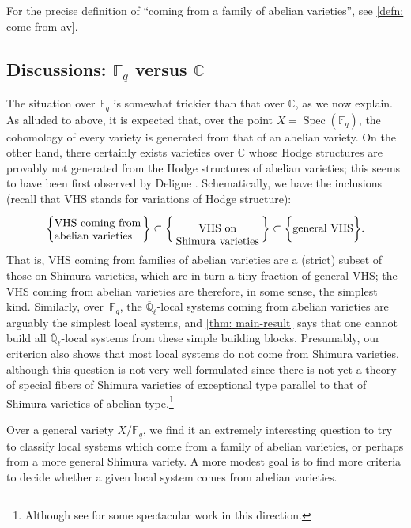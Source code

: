 \documentclass[11pt]{article}
\numberwithin{equation}{subsection}
\theoremstyle{definition}
\DeclareMathOperator\Spec{Spec}
\newcommand{\Qlbar}{\overline{\mathbb{Q}}_{\ell}}
\let\mb\mathbb
\begin{document}
For the precise definition of \enquote{coming from a family of abelian varieties}, see \cref{defn: come-from-av}.

\subsection{Discussions: \texorpdfstring{$\mb{F}_q$}{Fq} versus \texorpdfstring{$\mb{C}$}{C}}
The situation over $\mb{F}_q$ is somewhat trickier than that over $\mb{C}$, as we now explain. As alluded to above, it is expected that, over the point $X=\Spec(\mb{F}_q)$, the cohomology of every variety is generated from that of an abelian variety. On the other hand, there certainly exists varieties over $\mb{C}$ whose Hodge structures are provably not generated from the Hodge structures of abelian varieties; this seems to have been first observed by Deligne \cite[\S 7.6]{Deligne-La-conjecture-de-Weil-pour-les-surfaces-K3}.
Schematically, we have the inclusions (recall that VHS stands for variations of Hodge structure):
\[
\bigg\{
\parbox{8em}{VHS coming from\\abelian varieties}
\bigg\} \subset
\bigg\{\parbox{8em}{\center VHS on \\Shimura varieties}
\bigg\} \subset
\bigg\{
\parbox{5.5em}{general VHS}
\bigg\}.
\]
That is, VHS coming from families of abelian varieties are a (strict) subset of those on Shimura varieties, which are in turn a tiny fraction of general VHS; the VHS coming from abelian varieties are therefore, in some sense, the simplest kind. Similarly, over~$\mb{F}_q$, the $\Qlbar$-local systems coming from abelian varieties are arguably the simplest local systems, and \cref{thm: main-result} says that one cannot build all $\Qlbar$-local systems from these simple building blocks. Presumably, our criterion also shows that most local systems do not come from Shimura varieties, although this question is not very well formulated since there is not yet a theory of special fibers of Shimura varieties of exceptional type parallel to that of Shimura varieties of abelian type.\footnote{Although see \cite{Bakker-Shankar-Tsimerman-Integral-Canonical-Models-of-Exceptional-Shimura-Varieties} for some spectacular work in this direction.}

Over a general variety $X/\mb{F}_q$, we find it an extremely interesting question to try to classify local systems which come from a family of abelian varieties, or perhaps from a more general Shimura variety. A more modest goal is to find more criteria to decide whether a given local system comes from abelian varieties.
\end{document}
